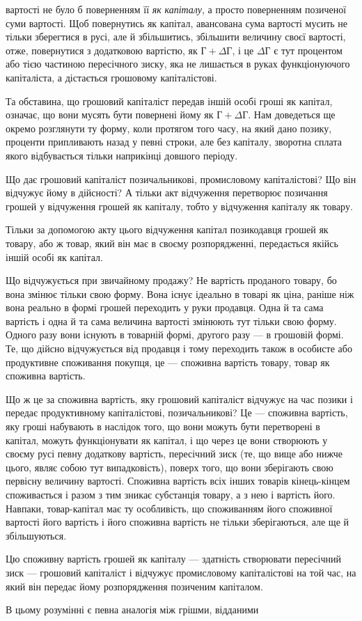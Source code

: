 \parcont{}  %
вартості не було б поверненням її \emph{як} \emph{капіталу}, а просто поверненням
позиченої суми вартості. Щоб повернутись як капітал,
авансована сума вартості мусить не тільки зберегтися в русі,
але й збільшитись, збільшити величину своєї вартості, отже,
повернутися з додатковою вартістю, як $Г + ΔГ$, і це $ΔГ$ є тут
процентом або тією частиною пересічного зиску, яка не лишається
в руках функціонуючого капіталіста, а дістається грошовому капіталістові.

Та обставина, що грошовий капіталіст передав іншій особі
гроші як капітал, означає, що вони мусять бути повернені йому
як $Г + ΔГ$. Нам доведеться ще окремо розглянути ту форму, коли
протягом того часу, на який дано позику, проценти припливають
назад у певні строки, але без капіталу, зворотна сплата якого
відбувається тільки наприкінці довшого періоду.

Що дає грошовий капіталіст позичальникові, промисловому
капіталістові? Що він відчужує йому в дійсності? А тільки акт
відчуження перетворює позичання грошей у відчуження грошей
як капіталу, тобто у відчуження капіталу як товару.

Тільки за допомогою акту цього відчуження капітал позикодавця
грошей як товару, або ж товар, який він має в своєму
розпорядженні, передається якійсь іншій особі як капітал.

Що відчужується при звичайному продажу? Не вартість проданого
товару, бо вона змінює тільки свою форму. Вона існує ідеально
в товарі як ціна, раніше ніж вона реально в формі грошей
переходить у руки продавця. Одна й та сама вартість і одна й та
сама величина вартості змінюють тут тільки свою форму. Одного
разу вони існують в товарній формі, другого разу — в грошовій
формі. Те, що дійсно відчужується від продавця і тому переходить
також в особисте або продуктивне споживання покупця,
це — споживна вартість товару, товар як споживна вартість.

Що ж це за споживна вартість, яку грошовий капіталіст відчужує
на час позики і передає продуктивному капіталістові,
позичальникові? Це — споживна вартість, яку гроші набувають
в наслідок того, що вони можуть бути перетворені в капітал,
можуть функціонувати як капітал, і що через це вони створюють
у своєму русі певну додаткову вартість, пересічний зиск (те,
що вище або нижче цього, являє собою тут випадковість), поверх
того, що вони зберігають свою первісну величину вартості. Споживна
вартість всіх інших товарів кінець-кінцем споживається
і разом з тим зникає субстанція товару, а з нею і вартість його.
Навпаки, товар-капітал має ту особливість, що споживанням його
споживної вартості його вартість і його споживна вартість не
тільки зберігаються, але ще й збільшуються.

Цю споживну вартість грошей як капіталу — здатність створювати
пересічний зиск — грошовий капіталіст і відчужує промисловому
капіталістові на той час, на який він передає йому
розпорядження позиченим капіталом.

В цьому розумінні є певна аналогія між грішми, відданими
\parbreak{}  %
